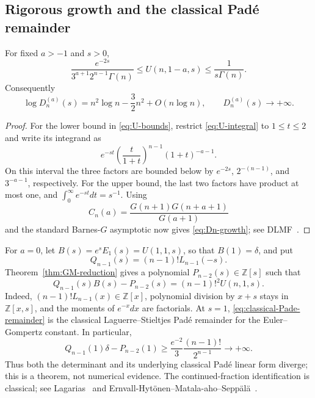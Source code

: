 \subsection{Rigorous growth and the classical Pad\'e remainder}

\begin{theorem}
\label{thm:Laguerre-divergence}
For fixed \(a>-1\) and \(s>0\),
\begin{equation}
 \frac{e^{-2s}}{3^{a+1}2^{n-1}\Gamma(n)}
 \leq U(n,1-a,s)\leq\frac1{s\Gamma(n)}.
 \label{eq:U-bounds}
\end{equation}
Consequently
\begin{equation}
 \boxed{
 \log D_n^{(a)}(s)=n^2\log n-\frac32n^2+O(n\log n),}
 \qquad
 D_n^{(a)}(s)\longrightarrow+\infty.
 \label{eq:Dn-growth}
\end{equation}
\end{theorem}

\begin{proof}
For the lower bound in \eqref{eq:U-bounds}, restrict
\eqref{eq:U-integral} to \(1\leq t\leq2\) and write its integrand as
\[
 e^{-st}\left(\frac{t}{1+t}\right)^{n-1}(1+t)^{-a-1}.
\]
On this interval the three factors are bounded below by
\(e^{-2s}\), \(2^{-(n-1)}\), and \(3^{-a-1}\), respectively.  For the upper
bound, the last two factors have product at most one, and
\(\int_0^\infty e^{-st}dt=s^{-1}\).
Using
\[
 C_n(a)=\frac{G(n+1)G(n+a+1)}{G(a+1)}
\]
and the standard Barnes-\(G\) asymptotic now gives
\eqref{eq:Dn-growth}; see DLMF~\cite[\S5.17]{DLMF}.
\end{proof}

For \(a=0\), let \(B(s)=e^sE_1(s)=U(1,1,s)\), so that
\(B(1)=\delta\), and put
\[
 Q_{n-1}(s)=(n-1)!L_{n-1}(-s).
\]
Theorem~\ref{thm:GM-reduction} gives a polynomial
\(P_{n-2}(s)\in\mathbb Z[s]\) such that
\begin{equation}
 \boxed{
 Q_{n-1}(s)B(s)-P_{n-2}(s)=(n-1)!^2U(n,1,s).}
 \label{eq:classical-Pade-remainder}
\end{equation}
Indeed, \((n-1)!L_{n-1}(x)\in\mathbb Z[x]\), polynomial division by
\(x+s\) stays in \(\mathbb Z[x,s]\), and the moments of \(e^{-x}dx\) are
factorials.  At \(s=1\), \eqref{eq:classical-Pade-remainder} is the classical
Laguerre--Stieltjes Pad\'e remainder for the Euler--Gompertz constant.  In
particular,
\begin{equation}
 Q_{n-1}(1)\delta-P_{n-2}(1)
 \geq \frac{e^{-2}}{3}\frac{(n-1)!}{2^{n-1}}
 \longrightarrow+\infty.
 \label{eq:Pade-divergence}
\end{equation}
Thus both the determinant and its underlying classical Pad\'e linear form
diverge; this is a theorem, not numerical evidence.  The continued-fraction
identification is classical; see
Lagarias~\cite[\S2.5]{Lagarias2013} and
Ernvall-Hyt\"onen--Matala-aho--Sepp\"al\"a~\cite{EMHS2023}.

